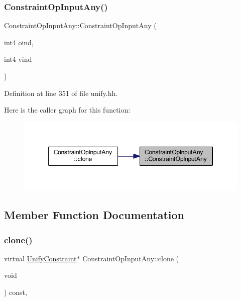 \subsubsection{\texorpdfstring{ConstraintOpInputAny()}{ConstraintOpInputAny()}}
{\footnotesize\ttfamily Constraint\+Op\+Input\+Any\+::\+Constraint\+Op\+Input\+Any (\begin{DoxyParamCaption}\item[{int4}]{oind,  }\item[{int4}]{vind }\end{DoxyParamCaption})\hspace{0.3cm}{\ttfamily [inline]}}



Definition at line 351 of file unify.\+hh.

Here is the caller graph for this function\+:
\nopagebreak
\begin{figure}[H]
\begin{center}
\leavevmode
\includegraphics[width=346pt]{class_constraint_op_input_any_a501bfa403a33e528bb8947d9ac154f18_icgraph}
\end{center}
\end{figure}


\subsection{Member Function Documentation}
\mbox{\label{class_constraint_op_input_any_acb465f5609db781a6d04aa6305964a7a}} 
\subsubsection{\texorpdfstring{clone()}{clone()}}
{\footnotesize\ttfamily virtual \mbox{\hyperlink{class_unify_constraint}{Unify\+Constraint}}$\ast$ Constraint\+Op\+Input\+Any\+::clone (\begin{DoxyParamCaption}\item[{void}]{ }\end{DoxyParamCaption}) const\hspace{0.3cm}{\ttfamily [inline]}, {\ttfamily [virtual]}}



